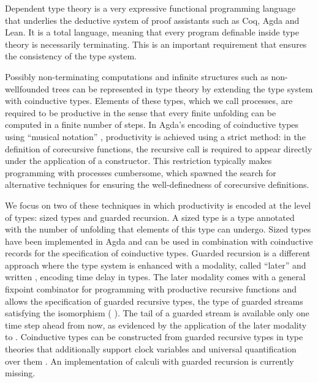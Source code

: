 Dependent type theory is a very expressive functional programming
language that underlies the deductive system of proof assistants such
as Coq, Agda \cite{norell2008} and Lean.  It is a total language,
meaning that every program definable inside type theory is necessarily
terminating. This is an important requirement that ensures the
consistency of the type system. 

Possibly non-terminating computations
and infinite structures such as non-wellfounded trees can be
represented in type theory by extending the type system with
coinductive types. Elements of these types, which we call processes,
are required to be productive \cite{Coquand93} in the sense that every
finite unfolding can be computed in a finite number of steps.
In Agda's encoding of coinductive types using ``musical notation''
, productivity is achieved using a strict method: in the
definition of corecursive functions, the recursive
call is required to appear directly under
the application of a constructor. This restriction
typically makes programming with processes cumbersome,
which spawned the search for alternative techniques for ensuring the
well-definedness of corecursive definitions.

We focus on two of these techniques in which productivity is encoded
at the level of types: sized types and guarded recursion. A sized type
 is a type annotated with the number of unfolding that
elements of this type can undergo. Sized types have been implemented
in Agda \cite{A-sized,AVW-normalization} and can be used in
combination with coinductive records  for the
specification of coinductive types.  Guarded recursion  is a different approach where the type system is enhanced
with a modality, called ``later'' and written , encoding time
delay in types. The later modality comes with a general fixpoint
combinator for programming with productive recursive functions and
allows the specification of guarded recursive types, \eg the
type of guarded streams satisfying the isomorphism 
     ( ). The tail
of a guarded stream is available only one time step ahead from now, as
evidenced by the application of the later modality to 
. Coinductive types can be constructed from guarded recursive
types in type theories that additionally support clock variables and
universal quantification over them
\cite{atkey2013productive,BahrGM17}. An implementation of
calculi with guarded recursion is currently missing.

